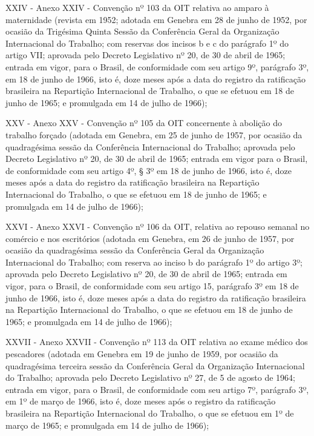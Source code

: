 \documentclass[
]{book}
\begin{document}
XXIV - Anexo XXIV - Convenção nº 103 da OIT relativa ao amparo à maternidade (revista em 1952; adotada em Genebra em 28 de junho de 1952, por ocasião da Trigésima Quinta Sessão da Conferência Geral da Organização Internacional do Trabalho; com reservas dos incisos b e c do parágrafo 1º do artigo VII; aprovada pelo Decreto Legislativo nº 20, de 30 de abril de 1965; entrada em vigor, para o Brasil, de conformidade com seu artigo 9º, parágrafo 3º, em 18 de junho de 1966, isto é, doze meses após a data do registro da ratificação brasileira na Repartição Internacional de Trabalho, o que se efetuou em 18 de junho de 1965; e promulgada em 14 de julho de 1966);

XXV - Anexo XXV - Convenção nº 105 da OIT concernente à abolição do trabalho forçado (adotada em Genebra, em 25 de junho de 1957, por ocasião da quadragésima sessão da Conferência Internacional do Trabalho; aprovada pelo Decreto Legislativo nº 20, de 30 de abril de 1965; entrada em vigor para o Brasil, de conformidade com seu artigo 4º, § 3º em 18 de junho de 1966, isto é, doze meses após a data do registro da ratificação brasileira na Repartição Internacional do Trabalho, o que se efetuou em 18 de junho de 1965; e promulgada em 14 de julho de 1966);

XXVI - Anexo XXVI - Convenção nº 106 da OIT, relativa ao repouso semanal no comércio e nos escritórios (adotada em Genebra, em 26 de junho de 1957, por ocasião da quadragésima sessão da Conferência Geral da Organização Internacional do Trabalho; com reserva ao inciso b do parágrafo 1º do artigo 3º; aprovada pelo Decreto Legislativo nº 20, de 30 de abril de 1965; entrada em vigor, para o Brasil, de conformidade com seu artigo 15, parágrafo 3º em 18 de junho de 1966, isto é, doze meses após a data do registro da ratificação brasileira na Repartição Internacional do Trabalho, o que se efetuou em 18 de junho de 1965; e promulgada em 14 de julho de 1966);

XXVII - Anexo XXVII - Convenção nº 113 da OIT relativa ao exame médico dos pescadores (adotada em Genebra em 19 de junho de 1959, por ocasião da quadragésima terceira sessão da Conferência Geral da Organização Internacional do Trabalho; aprovada pelo Decreto Legislativo nº 27, de 5 de agosto de 1964; entrada em vigor, para o Brasil, de conformidade com seu artigo 7º, parágrafo 3º, em 1º de março de 1966, isto é, doze meses após o registro da ratificação brasileira na Repartição Internacional do Trabalho, o que se efetuou em 1º de março de 1965; e promulgada em 14 de julho de 1966);
\end{document}
